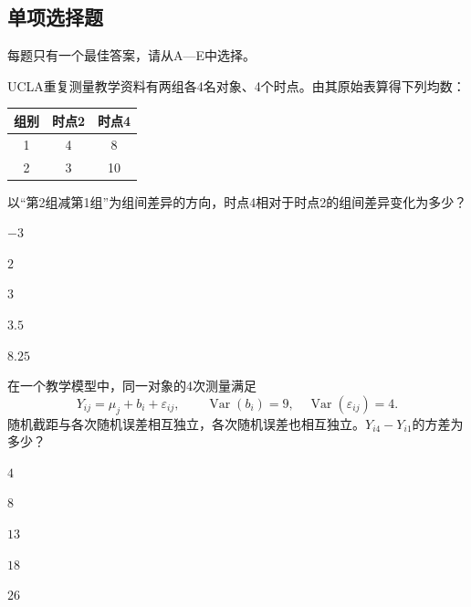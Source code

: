 \subsection{单项选择题}
每题只有一个最佳答案，请从A—E中选择。

\par\noindent\begin{minipage}{\linewidth}
UCLA重复测量教学资料有两组各4名对象、4个时点。由其原始表算得下列均数：
\begin{center}\begin{tabular}{ccc}\toprule
组别 & 时点2 & 时点4\\\midrule
1 & 4 & 8\\
2 & 3 & 10\\\bottomrule
\end{tabular}\end{center}
以“第2组减第1组”为组间差异的方向，时点4相对于时点2的组间差异变化为多少？
\begin{choices}
\item $-3$
\item $2$
\item $3$
\item $3.5$
\item $8.25$
\end{choices}
\end{minipage}\par\medskip

\par\noindent\begin{minipage}{\linewidth}
在一个教学模型中，同一对象的4次测量满足
\[
Y_{ij}=\mu_j+b_i+\varepsilon_{ij},\qquad
\operatorname{Var}(b_i)=9,\quad \operatorname{Var}(\varepsilon_{ij})=4.
\]
随机截距与各次随机误差相互独立，各次随机误差也相互独立。$Y_{i4}-Y_{i1}$的方差为多少？
\begin{choices}
\item $4$
\item $8$
\item $13$
\item $18$
\item $26$
\end{choices}
\end{minipage}\par\medskip

